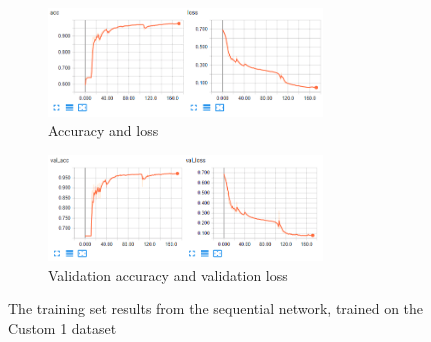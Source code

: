 \documentclass[USenglish]{ifimaster}  %
\begin{document}
\begin{figure}[ht]
\centering
\begin{subfigure}[b]{\textwidth}
\centering
\includegraphics[width=0.8\textwidth]{bilder/custom_1_training/Custom_1_sequential_acc_training_results.png}
\caption{Accuracy and loss}
\label{fig:custom_1_sequential_acc_result}
\end{subfigure}
\hfill
\begin{subfigure}[b]{\textwidth}
\centering
\includegraphics[width=0.8\textwidth]{bilder/custom_1_training/Custom_1_sequential_val_acc_training_results.png}
\caption{Validation accuracy and validation loss}
\label{fig:custom_1_sequential_val_acc_result}
\end{subfigure}
\caption{The training set results from the sequential network, trained on the Custom 1 dataset}
\label{fig:custom_1_sequential_result}
\end{figure}
\end{document}
